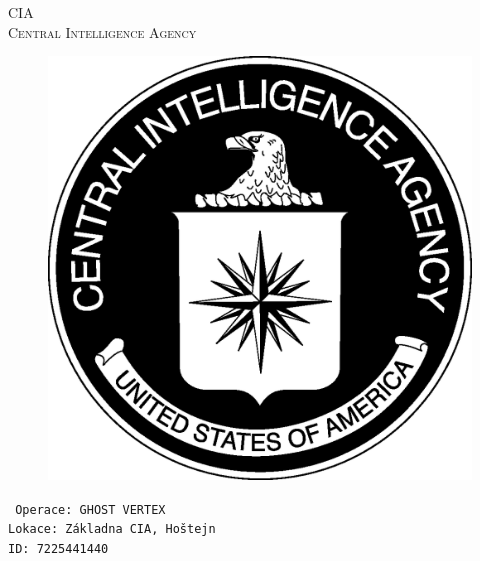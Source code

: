 \documentclass[a4paper, \fontheight]{article}
\begin{document}
	\begin{titlepage}
		\begin{center}		
			\textsc{{\fontsize{80}{0}\selectfont CIA}\\[2em]
				\Huge Central Intelligence Agency\\[2.5em]}
				
			\begin{figure}[H]
				\centering
				\includegraphics[scale=0.6]{sources/CIA_logo.eps}
			\end{figure}
		\end{center}	
		\vfill
		\noindent
		\texttt{\LARGE
				Operace: GHOST VERTEX\\[0.4em]
				Lokace: Základna CIA, Hoštejn\\[0.4em]
				ID: 7225441440}	
\end{titlepage} 
\end{document}
